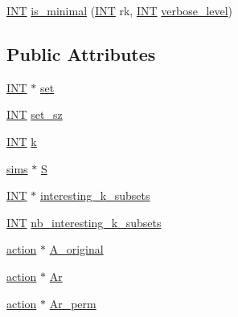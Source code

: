 \begin{DoxyCompactItemize}
\item 
\mbox{\hyperlink{galois_8h_a09fddde158a3a20bd2dcadb609de11dc}{I\+NT}} \mbox{\hyperlink{classunion__find__on__k__subsets_aaccc96b763e0af9bf15d24705ea0f3f1}{is\+\_\+minimal}} (\mbox{\hyperlink{galois_8h_a09fddde158a3a20bd2dcadb609de11dc}{I\+NT}} rk, \mbox{\hyperlink{galois_8h_a09fddde158a3a20bd2dcadb609de11dc}{I\+NT}} \mbox{\hyperlink{simeon_8_c_a818073fbcc2f439e7c56952f67386122}{verbose\+\_\+level}})
\end{DoxyCompactItemize}
\subsection*{Public Attributes}
\begin{DoxyCompactItemize}
\item 
\mbox{\hyperlink{galois_8h_a09fddde158a3a20bd2dcadb609de11dc}{I\+NT}} $\ast$ \mbox{\hyperlink{classunion__find__on__k__subsets_a3df62ab946bb729763c1a5bb8cb6f764}{set}}
\item 
\mbox{\hyperlink{galois_8h_a09fddde158a3a20bd2dcadb609de11dc}{I\+NT}} \mbox{\hyperlink{classunion__find__on__k__subsets_a68eb55ea0295ba154b1e29b96a71b70e}{set\+\_\+sz}}
\item 
\mbox{\hyperlink{galois_8h_a09fddde158a3a20bd2dcadb609de11dc}{I\+NT}} \mbox{\hyperlink{classunion__find__on__k__subsets_a4e8261087b44b253fcb01a9d49441772}{k}}
\item 
\mbox{\hyperlink{classsims}{sims}} $\ast$ \mbox{\hyperlink{classunion__find__on__k__subsets_a89f8222669c7ebe0245ddb2f191c4054}{S}}
\item 
\mbox{\hyperlink{galois_8h_a09fddde158a3a20bd2dcadb609de11dc}{I\+NT}} $\ast$ \mbox{\hyperlink{classunion__find__on__k__subsets_a356f0bf9b754026870948f252b553cfd}{interesting\+\_\+k\+\_\+subsets}}
\item 
\mbox{\hyperlink{galois_8h_a09fddde158a3a20bd2dcadb609de11dc}{I\+NT}} \mbox{\hyperlink{classunion__find__on__k__subsets_a05d81605a3c42a96d888421d39bc0171}{nb\+\_\+interesting\+\_\+k\+\_\+subsets}}
\item 
\mbox{\hyperlink{classaction}{action}} $\ast$ \mbox{\hyperlink{classunion__find__on__k__subsets_a7426b6d7a6c231c5af1365dffd849587}{A\+\_\+original}}
\item 
\mbox{\hyperlink{classaction}{action}} $\ast$ \mbox{\hyperlink{classunion__find__on__k__subsets_a1cf3f264c9c2f3a163607c8cd1acf9d1}{Ar}}
\item 
\mbox{\hyperlink{classaction}{action}} $\ast$ \mbox{\hyperlink{classunion__find__on__k__subsets_ad60bcf276a3fff06b10c7216a2e2e7be}{Ar\+\_\+perm}}

\end{DoxyCompactItemize}
